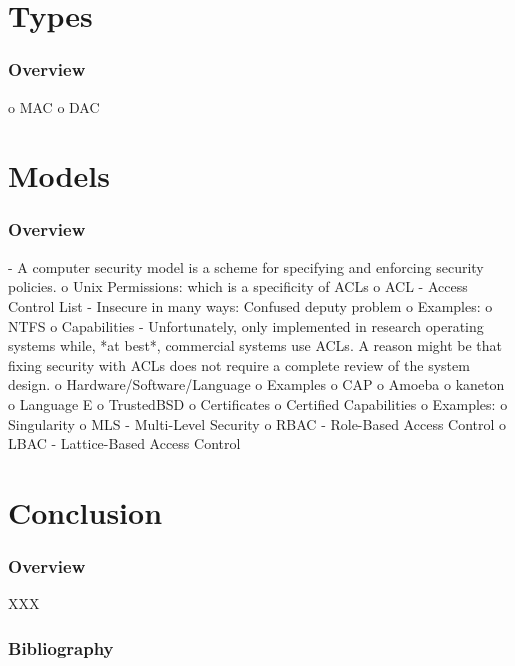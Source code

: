 %
%

\section{Types}


\begin{frame}
  \frametitle{Overview}

  o MAC
  o DAC
\end{frame}

%
%

\section{Models}


\begin{frame}
  \frametitle{Overview}

  - A computer security model is a scheme for specifying and enforcing security policies.
  o Unix Permissions: which is a specificity of ACLs
  o ACL - Access Control List
    - Insecure in many ways: Confused deputy problem
    o Examples:
      o NTFS
  o Capabilities
    - Unfortunately, only implemented in research operating systems while, *at best*, commercial
      systems use ACLs. A reason might be that fixing security with ACLs does not require
      a complete review of the system design.
    o Hardware/Software/Language
    o Examples
      o CAP
      o Amoeba
      o kaneton
      o Language E
      o TrustedBSD
  o Certificates
    o Certified Capabilities
    o Examples:
      o Singularity
  o MLS - Multi-Level Security
  o RBAC - Role-Based Access Control
  o LBAC - Lattice-Based Access Control
\end{frame}

%
%

\section{Conclusion}


\begin{frame}
  \frametitle{Overview}

  XXX
\end{frame}

%
%

\begin{frame}
  \frametitle{Bibliography}

  
  
\end{frame}


